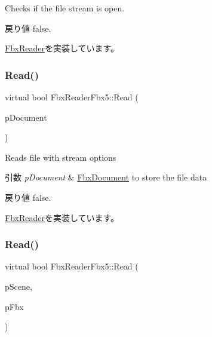 Checks if the file stream is open. \begin{DoxyReturn}{戻り値}
{\ttfamily false}. 
\end{DoxyReturn}


\hyperlink{class_fbx_reader_af86b437702ffc840cfab52185cbc7232}{Fbx\+Reader}を実装しています。

\mbox{\label{class_fbx_reader_fbx5_aac75f44d42d473ac88a54c81ec5b1af6}} 
\subsubsection{\texorpdfstring{Read()}{Read()}\hspace{0.1cm}{\footnotesize\ttfamily [1/2]}}
{\footnotesize\ttfamily virtual bool Fbx\+Reader\+Fbx5\+::\+Read (\begin{DoxyParamCaption}\item[{\hyperlink{class_fbx_document}{Fbx\+Document} $\ast$}]{p\+Document }\end{DoxyParamCaption})\hspace{0.3cm}{\ttfamily [virtual]}}

Reads file with stream options 
\begin{DoxyParams}{引数}
{\em p\+Document} & \hyperlink{class_fbx_document}{Fbx\+Document} to store the file data \\
\hline
\end{DoxyParams}
\begin{DoxyReturn}{戻り値}
{\ttfamily false}. 
\end{DoxyReturn}


\hyperlink{class_fbx_reader_a29941746acc73d7ffd2411a9be9d2525}{Fbx\+Reader}を実装しています。

\mbox{\label{class_fbx_reader_fbx5_a9f5142bf143ff9192bb7d687c831ad21}} 
\subsubsection{\texorpdfstring{Read()}{Read()}\hspace{0.1cm}{\footnotesize\ttfamily [2/2]}}
{\footnotesize\ttfamily virtual bool Fbx\+Reader\+Fbx5\+::\+Read (\begin{DoxyParamCaption}\item[{\hyperlink{class_fbx_scene}{Fbx\+Scene} \&}]{p\+Scene,  }\item[{\hyperlink{class_fbx_i_o}{Fbx\+IO} $\ast$}]{p\+Fbx }\end{DoxyParamCaption})\hspace{0.3cm}{\ttfamily [virtual]}}

